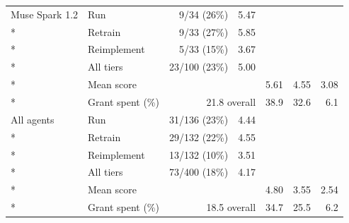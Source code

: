 {\begin{longtable}{@{}llrrrrr@{}}
\midrule
Muse Spark 1.2 & Run & 9/34 (26\%) & 5.47 & & & \\*
& Retrain & 9/33 (27\%) & 5.85 & & & \\*
& Reimplement & 5/33 (15\%) & 3.67 & & & \\*
& All tiers & 23/100 (23\%) & 5.00 & & & \\*
& Mean score & & & 5.61 & 4.55 & 3.08 \\*
& Grant spent (\%) & \multicolumn{2}{r}{21.8 overall} & 38.9 & 32.6 & 6.1 \\
\midrule
All agents & Run & 31/136 (23\%) & 4.44 & & & \\*
& Retrain & 29/132 (22\%) & 4.55 & & & \\*
& Reimplement & 13/132 (10\%) & 3.51 & & & \\*
& All tiers & 73/400 (18\%) & 4.17 & & & \\*
& Mean score & & & 4.80 & 3.55 & 2.54 \\*
& Grant spent (\%) & \multicolumn{2}{r}{18.5 overall} & 34.7 & 25.5 & 6.2 \\
\end{longtable}
}

\FloatBarrier  %

